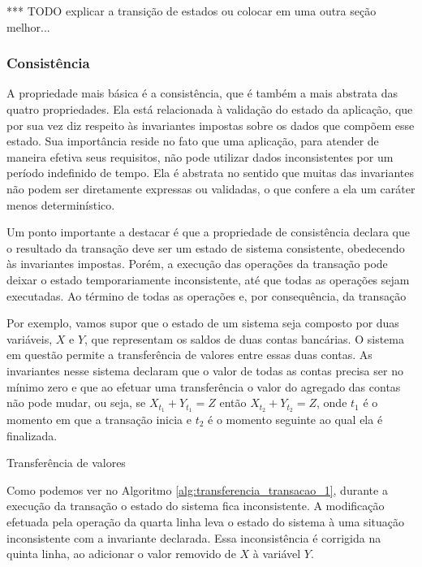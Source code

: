 \documentclass[11pt,twoside,a4paper]{book}
\begin{document}
*** TODO explicar a transição de estados ou colocar em uma outra seção melhor...

\subsubsection*{Consistência}
A propriedade mais básica é a consistência, que é também a mais abstrata das quatro propriedades. Ela está relacionada à validação do estado da aplicação, que por sua vez diz respeito às invariantes impostas sobre os dados que compõem esse estado. Sua importância reside no fato que uma aplicação, para atender de maneira efetiva seus requisitos, não pode utilizar dados inconsistentes por um período indefinido de tempo. Ela é abstrata no sentido que muitas das invariantes não podem ser diretamente expressas ou validadas, o que confere a ela um caráter menos determinístico.

Um ponto importante a destacar é que a propriedade de consistência declara que o resultado da transação deve ser um estado de sistema consistente, obedecendo às invariantes impostas. Porém, a execução das operações da transação pode deixar o estado temporariamente inconsistente, até que todas as operações sejam executadas. Ao término de todas as operações e, por consequência, da transação

Por exemplo, vamos supor que o estado de um sistema seja composto por duas variáveis, $X$ e $Y$, que representam os saldos de duas contas bancárias. O sistema em questão permite a transferência de valores entre essas duas contas. As invariantes nesse sistema declaram que o valor de todas as contas precisa ser no mínimo zero e que ao efetuar uma transferência o valor do agregado das contas não pode mudar, ou seja, se $X_{t_1} + Y_{t_1} = Z$ então $X_{t_2} + Y_{t_2} = Z$, onde $t_1$ é o momento em que a transação inicia e $t_2$ é o momento seguinte ao qual ela é finalizada.

\begin{algorithm}
\caption{Transferência de valores}
\label{alg:transferencia_transacao_1}
\end{algorithm}

Como podemos ver no Algoritmo \ref{alg:transferencia_transacao_1}, durante a execução da transação o estado do sistema fica inconsistente. A modificação efetuada pela operação da quarta linha leva o estado do sistema à uma situação inconsistente com a invariante declarada. Essa inconsistência é corrigida na quinta linha, ao adicionar o valor removido de $X$ à variável $Y$.
\end{document}
